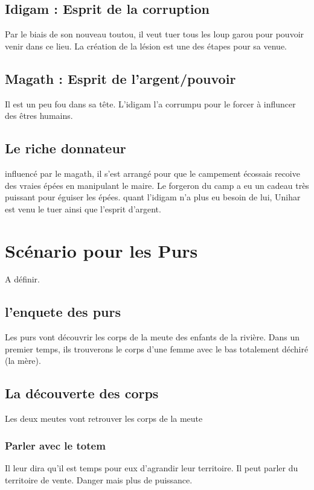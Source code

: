 \documentclass[oneside,12pt]{book}
\begin{document}
\begin{flushleft}
\section{Idigam : Esprit de la corruption}
Par le biais de son nouveau toutou, il veut tuer tous les loup garou pour pouvoir venir dans ce lieu. La création de la lésion est une des étapes pour sa venue.

\section{Magath : Esprit de l'argent/pouvoir}
Il est un peu fou dans sa tête. L'idigam l'a corrumpu pour le forcer à influncer des êtres humains.

\section{Le riche donnateur}
influencé par le magath, il s'est arrangé pour que le campement écossais recoive des vraies épées en manipulant le maire. 
Le forgeron du camp a eu un cadeau très puissant pour éguiser les épées. quant l'idigam n'a plus eu besoin de lui, Unihar est venu le tuer ainsi que l'esprit d'argent.






\chapter{Scénario pour les Purs}

A définir. 


\section{l'enquete des purs}
Les purs vont découvrir les corps de la meute des enfants de la rivière. 
Dans un premier temps, ils trouverons le corps d'une femme avec le bas totalement déchiré (la mère).



\section{}

\section{La découverte des corps}
Les deux meutes vont retrouver les corps de la meute
 
\subsection{Parler avec le totem}
Il leur dira qu'il est temps pour eux d'agrandir leur territoire. Il peut parler du territoire de vente. Danger mais plus de puissance.


\end{flushleft}
\end{document}
